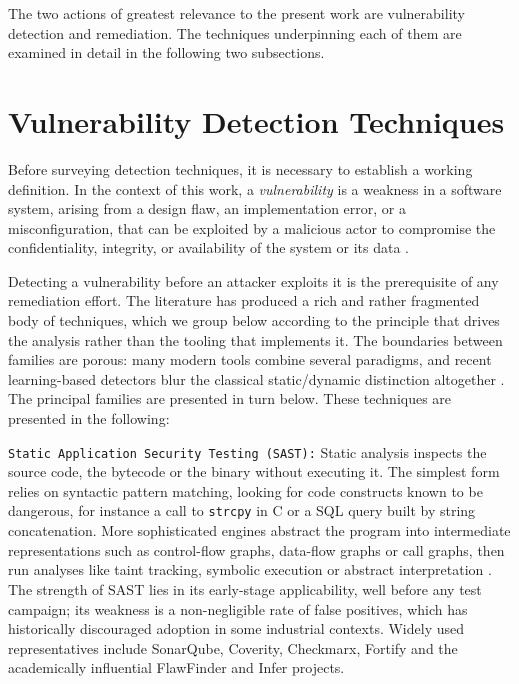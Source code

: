 The two actions of greatest relevance to the present work are vulnerability
detection and remediation. The techniques underpinning each of them are
examined in detail in the following two subsections.

\section{Vulnerability Detection Techniques}
\label{subsec:detection-techniques}

Before surveying detection techniques, it is necessary to establish a
working definition. In the context of this work, a \emph{vulnerability} is
a weakness in a software system, arising from a design flaw, an
implementation error, or a misconfiguration, that can be exploited by a
malicious actor to compromise the confidentiality, integrity, or
availability of the system or its data \citep{placeholder-detection-survey}.

Detecting a vulnerability before an attacker exploits it is the prerequisite
of any remediation effort. The literature has produced a rich and rather
fragmented body of techniques, which we group below according to the
principle that drives the analysis rather than the tooling that implements
it. The boundaries between families are porous: many modern tools combine
several paradigms, and recent learning-based detectors blur the classical
static/dynamic distinction altogether \citep{placeholder-detection-survey}. The
principal families are presented in turn below. These techniques are presented in the following:

\texttt{Static Application Security Testing (SAST):}
Static analysis inspects the source code, the bytecode or the binary
without executing it. The simplest form relies on syntactic
pattern matching, looking for code constructs known to be dangerous,
for instance a call to \texttt{strcpy} in C or a SQL query built by string
concatenation. More sophisticated engines abstract the program into
intermediate representations such as control-flow graphs, data-flow graphs
or call graphs, then run analyses like taint tracking, symbolic execution
or abstract interpretation \citep{placeholder-sast}. The strength of SAST
lies in its early-stage applicability, well before any test campaign;
its weakness is a non-negligible rate of false positives, which has
historically discouraged adoption in some industrial contexts. Widely used
representatives include SonarQube, Coverity, Checkmarx, Fortify and the
academically influential FlawFinder and Infer projects.

